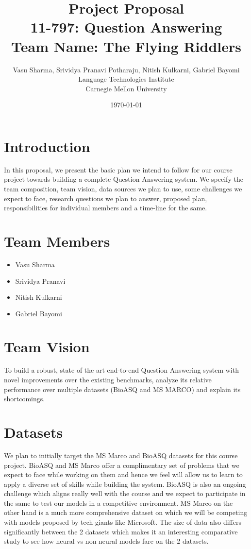 \documentclass{article}
\title{
Project Proposal \\
11-797: Question Answering \\
Team Name: The Flying Riddlers 
}
\author{
    Vasu Sharma,
    Srividya Pranavi Potharaju,
    Nitish Kulkarni, 
    Gabriel Bayomi \\
    Language Technologies Institute \\
    Carnegie Mellon University
}
\date{\today}
\begin{document}
\maketitle

\section{Introduction}

In this proposal, we present the basic plan we intend to follow for our course project towards building a complete Question Answering system. We specify the team composition, team vision, data sources we plan to use, some challenges we expect to face, research questions we plan to answer, proposed plan, responsibilities for individual members and a time-line for the same.

\section{Team Members}
\begin{itemize}
    \item Vasu Sharma
    \item Srividya Pranavi
    \item Nitish Kulkarni
    \item Gabriel Bayomi
\end{itemize}

\section{Team Vision}

To build a robust, state of the art end-to-end Question Answering system with novel improvements over the existing benchmarks, analyze its relative performance over multiple datasets (BioASQ and MS MARCO) and explain its shortcomings.

\section{Datasets}
We plan to initially target the MS Marco \cite{msmarco} and BioASQ \cite{bioasq} datasets for this course project. BioASQ and MS Marco offer a complimentary set of problems that we expect to face while working on them and hence we feel will allow us to learn to apply a diverse set of skills while building the system. BioASQ is also an ongoing challenge which aligns really well with the course and we expect to participate in the same to test our models in a competitive environment. MS Marco on the other hand is a much more comprehensive dataset on which we will be competing with models proposed by tech giants like Microsoft. The size of data also differs significantly between the 2 datasets which makes it an interesting comparative study to see how neural vs non neural models fare on the 2 datasets. 
\end{document}
